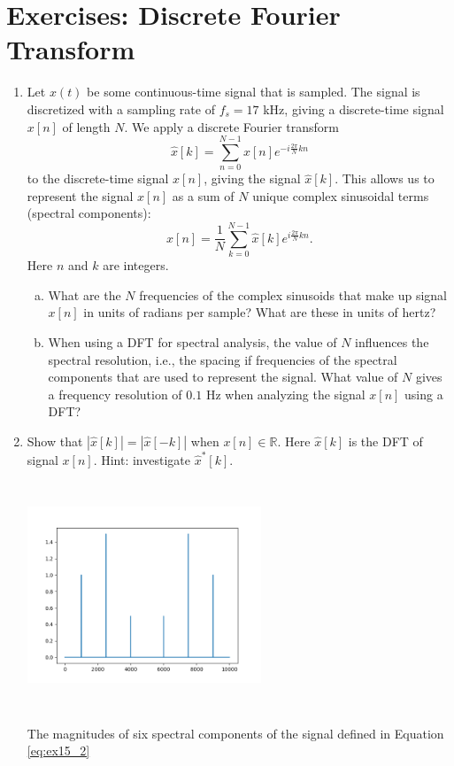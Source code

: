 \newpage
\section{Exercises: Discrete Fourier Transform}

\begin{enumerate}
\item Let $x(t)$ be some continuous-time signal that is sampled. The signal is discretized with a sampling rate of $f_{s}=17$ kHz, giving a discrete-time signal $x[n]$ of length $N$. We apply a discrete Fourier transform
\begin{equation}
\hat{x}[k] = \sum_{n=0}^{N-1} x[n] e^{-i\frac{2\pi}{N}kn}
\end{equation}
to the discrete-time signal $x[n]$, giving the signal
$\hat{x}[k]$. This allows us to represent the signal $x[n]$ as a sum of $N$
unique complex sinusoidal terms (spectral components):
\begin{equation}
x[n] = \frac{1}{N}\sum_{k=0}^{N-1} \hat{x}[k] e^{i\frac{2\pi}{N}kn}.
\end{equation}
Here $n$ and $k$ are integers.

\begin{enumerate}[a)]
    \item What are the $N$ frequencies of the complex sinusoids that make up signal $x[n]$ in units of radians per sample? What are these in units of hertz?
    
    \item When using a DFT for spectral analysis, the value of $N$ influences the spectral resolution, i.e., the spacing if frequencies of the spectral components that are used to represent the signal. What value of $N$ gives a frequency resolution of $0.1$ Hz when analyzing the signal $x[n]$ using a DFT?
\end{enumerate}

\item Show that $|\hat{x}[k]|=|\hat{x}[-k]|$ when $x[n] \in \mathbb{R}$. Here $\hat{x}[k]$ is the DFT of signal $x[n]$. Hint: investigate $\hat{x}^*[k]$.


\begin{marginfigure}
\includegraphics[width=7.0cm,height=6.8cm]{ch15/figures/ex152.png}
\caption{The magnitudes of six spectral components of the signal defined in Equation \ref{eq:ex15_2}}
\label{fig:ch15_ex15_2}
\end{marginfigure}


\end{enumerate}
